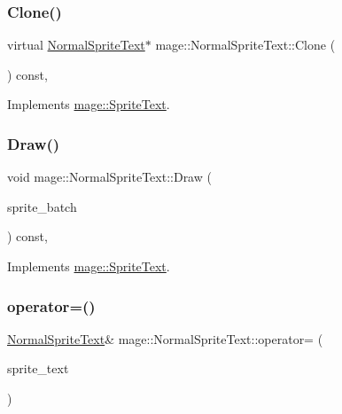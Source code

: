 \subsubsection{\texorpdfstring{Clone()}{Clone()}}
{\footnotesize\ttfamily virtual \hyperlink{classmage_1_1_normal_sprite_text}{Normal\+Sprite\+Text}$\ast$ mage\+::\+Normal\+Sprite\+Text\+::\+Clone (\begin{DoxyParamCaption}{ }\end{DoxyParamCaption}) const\hspace{0.3cm}{\ttfamily [override]}, {\ttfamily [virtual]}}



Implements \hyperlink{classmage_1_1_sprite_text_ac4edf927911a9fb8e5c3a674b217637a}{mage\+::\+Sprite\+Text}.

\hypertarget{classmage_1_1_normal_sprite_text_ad2a1b02bea18afd6bf61b106a727a355}{}\label{classmage_1_1_normal_sprite_text_ad2a1b02bea18afd6bf61b106a727a355} 
\subsubsection{\texorpdfstring{Draw()}{Draw()}}
{\footnotesize\ttfamily void mage\+::\+Normal\+Sprite\+Text\+::\+Draw (\begin{DoxyParamCaption}\item[{Sprite\+Batch \&}]{sprite\+\_\+batch }\end{DoxyParamCaption}) const\hspace{0.3cm}{\ttfamily [override]}, {\ttfamily [virtual]}}



Implements \hyperlink{classmage_1_1_sprite_text_a45d5ac8410d5a46b26e8491946a2ad9e}{mage\+::\+Sprite\+Text}.

\hypertarget{classmage_1_1_normal_sprite_text_a1c0f30872c4d3114f1e53183958354e5}{}\label{classmage_1_1_normal_sprite_text_a1c0f30872c4d3114f1e53183958354e5} 
\subsubsection{\texorpdfstring{operator=()}{operator=()}\hspace{0.1cm}{\footnotesize\ttfamily [1/2]}}
{\footnotesize\ttfamily \hyperlink{classmage_1_1_normal_sprite_text}{Normal\+Sprite\+Text}\& mage\+::\+Normal\+Sprite\+Text\+::operator= (\begin{DoxyParamCaption}\item[{const \hyperlink{classmage_1_1_normal_sprite_text}{Normal\+Sprite\+Text} \&}]{sprite\+\_\+text }\end{DoxyParamCaption})\hspace{0.3cm}{\ttfamily [default]}}

